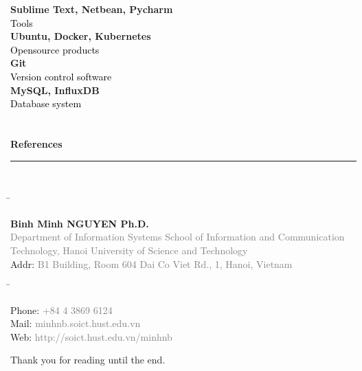 \documentclass[a4paper,12pt]{article}
\begin{document}
\textbf{Sublime Text, Netbean, Pycharm}\\
\hspace*{60pt}\textcolor{black}{Tools}\\

\textbf{Ubuntu, Docker, Kubernetes}\\
\hspace*{60pt}\textcolor{black}{Opensource products}\\

\textbf{Git}\\
\hspace*{60pt}\textcolor{black}{Version control software}\\

\textbf{MySQL, InfluxDB}\\
\hspace*{60pt}\textcolor{black}{Database system}\\
\\ \\
\textbf{\Large References \\}
\makebox[0pt][1]{\large\bf }\ignorespaces%
{\rule[-1mm]{\linewidth}{.5mm}}
\\[0.6cm]

\begin{tabbing}
\=	\begin{minipage}{0.5\textwidth}
	\begin{flushleft}		
	\textbf{Binh Minh NGUYEN Ph.D.}\\
	
\textcolor{gray}{Department of Information Systems
School of Information and Communication Technology, 
Hanoi University of Science and Technology} \\
	Addr: \textcolor{gray}{B1 Building, Room 604
Dai Co Viet Rd., 1, Hanoi, Vietnam\\	}
	\end{flushleft}
	\end{minipage}
\=  \begin{minipage}{0.5\textwidth}
	\begin{flushright}
	Phone: \textcolor{gray}{+84 4 3869 6124\\}
	Mail: \textcolor{gray}{minhnb.soict.hust.edu.vn\\}
	Web: \textcolor{gray}{http://soict.hust.edu.vn/minhnb}
	\end{flushright}		
	\end{minipage}
\end{tabbing}

\scriptsize\hfill   Thank you for reading until the end.
\end{document}
